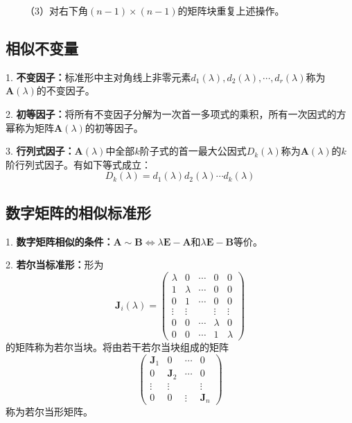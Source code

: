 ~~~~（3）对右下角$(n-1)\times (n-1)$的矩阵块重复上述操作。

\subsection{相似不变量}

1. \textbf{不变因子：}标准形中主对角线上非零元素$d_1(\lambda),d_2(\lambda),\cdots,d_r(\lambda)$称为$\boldsymbol{A}(\lambda)$的不变因子。

2. \textbf{初等因子：}将所有不变因子分解为一次首一多项式的乘积，所有一次因式的方幂称为矩阵$\boldsymbol{A}(\lambda)$的初等因子。

3. \textbf{行列式因子：}$\boldsymbol{A}(\lambda)$中全部$k$阶子式的首一最大公因式$D_k(\lambda)$称为$\boldsymbol{A}(\lambda)$的$k$阶行列式因子。有如下等式成立：
\begin{equation*}
    D_k(\lambda)=d_1(\lambda)d_2(\lambda)\cdots d_k(\lambda)
\end{equation*}

\subsection{数字矩阵的相似标准形}

1. \textbf{数字矩阵相似的条件：}$\boldsymbol{A}\sim \boldsymbol{B}\Leftrightarrow \lambda\boldsymbol{E}-\boldsymbol{A}$和$\lambda\boldsymbol{E}-\boldsymbol{B}$等价。

2. \textbf{若尔当标准形：}形为
\begin{equation*}
    \boldsymbol{J}_i(\lambda)=\begin{pmatrix}
        \lambda&0&\cdots&0&0\\
        1&\lambda&\cdots&0&0\\
        0&1&\cdots&0&0\\
        \vdots&\vdots&&\vdots&\vdots\\
        0&0&\cdots&\lambda&0\\
        0&0&\cdots&1&\lambda
    \end{pmatrix}
\end{equation*}
的矩阵称为若尔当块。将由若干若尔当块组成的矩阵\begin{equation*}
    \begin{pmatrix}
        \boldsymbol{J}_1&0&\cdots&0\\
        0&\boldsymbol{J}_2&\cdots&0\\
        \vdots&\vdots&&\vdots\\
        0&0&\vdots&\boldsymbol{J}_n
    \end{pmatrix}
\end{equation*}
称为若尔当形矩阵。

